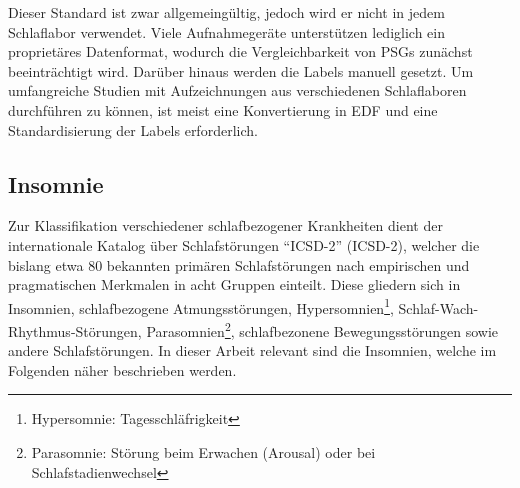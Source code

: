 Dieser Standard ist zwar allgemeingültig, jedoch wird er nicht in jedem Schlaflabor verwendet. Viele Aufnahmegeräte unterstützen lediglich ein proprietäres Datenformat, wodurch die Vergleichbarkeit von \acs{PSG}s zunächst beeinträchtigt wird. Darüber hinaus werden die Labels manuell gesetzt. Um umfangreiche Studien mit Aufzeichnungen aus verschiedenen Schlaflaboren durchführen zu können, ist meist eine Konvertierung in \acs{EDF} und eine Standardisierung der Labels erforderlich. 

\subsection{Insomnie}\label{insomnie} 

Zur Klassifikation verschiedener schlafbezogener Krankheiten dient der internationale Katalog über Schlafstörungen "`\acl{ICSD-2}"' (\acs{ICSD-2}), welcher die bislang etwa 80 bekannten primären Schlafstörungen nach empirischen und pragmatischen Merkmalen in acht Gruppen einteilt. Diese gliedern sich in Insomnien, schlafbezogene Atmungsstörungen, Hypersomnien\footnote{Hypersomnie: Tagesschläfrigkeit}, Schlaf-Wach-Rhythmus-Störungen, Parasomnien\footnote{Parasomnie: Störung beim Erwachen (Arousal) oder bei Schlafstadienwechsel}, schlafbezonene Bewegungsstörungen sowie andere Schlafstörungen. In dieser Arbeit relevant sind die Insomnien, welche im Folgenden näher beschrieben werden.\parencite{happe_schlafmedizin_2009, american_academy_of_sleep_medicine_international_2005}\\

